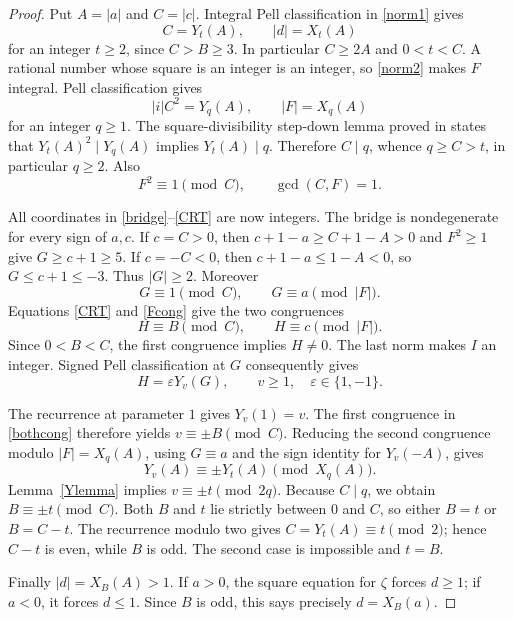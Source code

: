 \documentclass[11pt]{article}
\begin{document}
\begin{proof}
Put \(A=|a|\) and \(C=|c|\). Integral Pell classification
in \eqref{norm1} gives
\[
 C=Y_t(A),\qquad |d|=X_t(A)
\]
for an integer \(t\ge2\), since \(C>B\ge3\). In particular
\(C\ge2A\) and \(0<t<C\). A rational number whose square is
an integer is an integer, so \eqref{norm2} makes \(F\) integral.
Pell classification gives
\[
 |i|C^2=Y_q(A),\qquad |F|=X_q(A)
\]
for an integer \(q\ge1\). The square-divisibility step-down
lemma proved in \cite{Pell} states that
\(Y_t(A)^2\mid Y_q(A)\) implies \(Y_t(A)\mid q\).
Therefore \(C\mid q\), whence \(q\ge C>t\), in particular
\(q\ge2\). Also
\begin{equation}\label{Fcong}
 F^2\equiv1\pmod C,\qquad \gcd(C,F)=1.
\end{equation}

All coordinates in \eqref{bridge}--\eqref{CRT} are now integers.
The bridge is nondegenerate for every sign of \(a,c\). If
\(c=C>0\), then \(c+1-a\ge C+1-A>0\) and \(F^2\ge1\)
give \(G\ge c+1\ge5\). If \(c=-C<0\), then
\(c+1-a\le1-A<0\), so \(G\le c+1\le-3\).
Thus \(|G|\ge2\). Moreover
\[
 G\equiv1\pmod C,\qquad G\equiv a\pmod {|F|}.
\]
Equations \eqref{CRT} and \eqref{Fcong} give the two congruences
\begin{equation}\label{bothcong}
                    H\equiv B\pmod C,
                    \qquad H\equiv c\pmod {|F|}.
\end{equation}
Since \(0<B<C\), the first congruence implies \(H\ne0\).
The last norm makes \(I\) an integer. Signed Pell classification
at \(G\) consequently gives
\[
                  H=\varepsilon Y_v(G),\qquad v\ge1,
                  \quad\varepsilon\in\{1,-1\}.
\]

The recurrence at parameter \(1\) gives \(Y_v(1)=v\).
The first congruence in \eqref{bothcong} therefore yields
\(v\equiv\pm B\pmod C\). Reducing the second congruence
modulo \(|F|=X_q(A)\), using \(G\equiv a\) and the sign
identity for \(Y_v(-A)\), gives
\[
                   Y_v(A)\equiv\pm Y_t(A)\pmod{X_q(A)}.
\]
Lemma~\ref{Ylemma} implies \(v\equiv\pm t\pmod{2q}\).
Because \(C\mid q\), we obtain \(B\equiv\pm t\pmod C\).
Both \(B\) and \(t\) lie strictly between \(0\) and \(C\),
so either \(B=t\) or \(B=C-t\). The recurrence modulo two
gives \(C=Y_t(A)\equiv t\pmod2\); hence \(C-t\) is even,
while \(B\) is odd. The second case is impossible and \(t=B\).

Finally \(|d|=X_B(A)>1\). If \(a>0\), the square equation
for \(\zeta\) forces \(d\ge1\); if \(a<0\), it forces
\(d\le1\). Since \(B\) is odd, this says precisely
\(d=X_B(a)\).
\end{proof}
\end{document}
